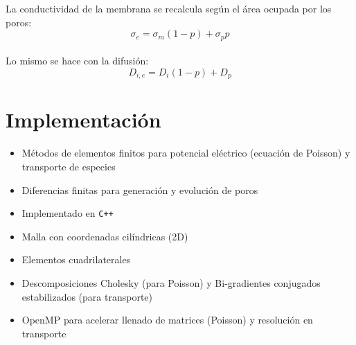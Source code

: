 \documentclass[a0,portrait]{a0poster}
\begin{document}
\begin{multicols}{2}
	La conductividad de la membrana se recalcula según el área ocupada por los poros:
	\begin{equation}
		\sigma_{e} = \sigma_m (1 - p) + \sigma_p p
	\end{equation}\\
	Lo mismo se hace con la difusión:
	\begin{equation}
		D_{i, e} = D_i (1 - p) + D_p
	\end{equation}


\section*{Implementación}
\begin{multicols}{2}
	\begin{itemize}
		\item Métodos de elementos finitos para potencial eléctrico (ecuación de Poisson) y transporte de especies
		\item Diferencias finitas para generación y evolución de poros
		\item Implementado en \texttt{C++}
		\item Malla con coordenadas cilíndricas (2D)
		\item Elementos cuadrilaterales
		\item Descomposiciones Cholesky (para Poisson) y Bi-gradientes conjugados estabilizados (para transporte)
		\item OpenMP para acelerar llenado de matrices (Poisson) y resolución en transporte
	\end{itemize}


\end{multicols}
\end{multicols}
\end{document}
